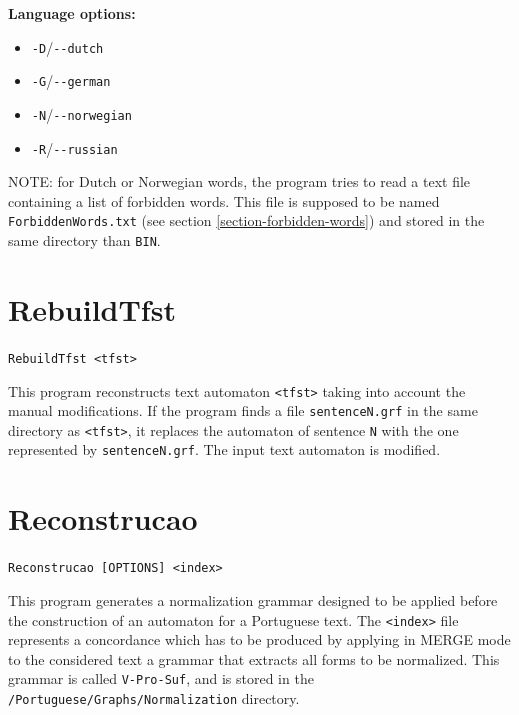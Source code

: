 \bigskip
\noindent \textbf{Language options:}
\begin{itemize}
  \item \verb+-D+/\verb+--dutch+
  \item \verb+-G+/\verb+--german+
  \item \verb+-N+/\verb+--norwegian+
  \item \verb+-R+/\verb+--russian+
\end{itemize}  

\bigskip
\noindent NOTE: for Dutch or Norwegian words, the program tries to read a text
file containing a list of forbidden words. This file is supposed to be named
\verb+ForbiddenWords.txt+ (see section \ref{section-forbidden-words}) and stored
in the same directory than \verb+BIN+.






\section{RebuildTfst}
\verb+RebuildTfst <tfst>+

\bigskip
\noindent {}This 
program reconstructs text automaton \verb+<tfst>+ taking into account the
manual modifications. If the program finds a file \verb+sentenceN.grf+ in the
same directory as \verb+<tfst>+, it replaces the automaton of sentence
\verb+N+ with the one represented by \verb+sentenceN.grf+. The input text
automaton is modified.






\section{Reconstrucao}
\verb+Reconstrucao [OPTIONS] <index>+

\bigskip
\noindent This program generates a normalization grammar designed to be applied
before the construction of an automaton for a Portuguese text. The \verb+<index>+ file
represents a concordance which has to be produced by applying in MERGE mode to
the considered text a grammar that extracts all forms to be normalized. This
grammar is called \verb+V-Pro-Suf+, and is stored in the
\verb+/Portuguese/Graphs/Normalization+ directory.

